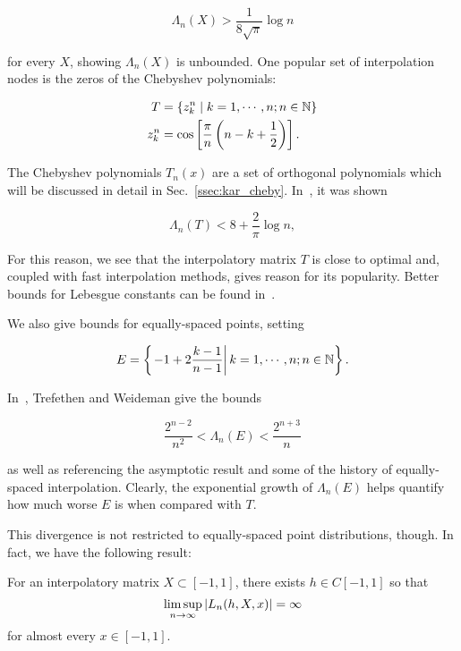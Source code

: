 \begin{equation}
    \Lambda_{n}(X) > \frac{1}{8\sqrt{\pi}}\log n
\end{equation}

\noindent
for every $X$, showing $\Lambda_{n}(X)$ is unbounded.
One popular set of interpolation nodes is the zeros
of the Chebyshev polynomials:

\begin{align}
    T &= \left\{ z_{k}^{n} \mid k=1,\cdots,n; n\in\mathbb{N} \right\} \nonumber\\
    z_{k}^{n} &= \cos\left[ \frac{\pi}{n}\left( n-k+\frac{1}{2} \right) \right].
\end{align}

\noindent
The Chebyshev polynomials $T_{n}(x)$ are a set of orthogonal polynomials
which will be discussed in detail in Sec.~\ref{ssec:kar_cheby}.
In~\cite{Brutman1978}, it was shown

\begin{equation}
    \Lambda_{n}(T) < 8 + \frac{2}{\pi}\log n,
\end{equation}

\noindent
For this reason, we see that the interpolatory matrix $T$
is close to optimal and,
coupled with fast interpolation methods, gives reason
for its popularity. Better bounds for Lebesgue
constants can be found in~\cite{smith2006lebesgue}.

We also give bounds for equally-spaced points, setting

\begin{equation}
    E = \left\{ \left. -1+2\frac{k-1}{n-1} \right| k=1,\cdots,n; n\in\mathbb{N} \right\}.
\end{equation}

\noindent
In~\cite{trefethen1991two}, Trefethen and Weideman give the bounds

\begin{equation}
    \frac{2^{n-2}}{n^{2}} < \Lambda_{n}(E) < \frac{2^{n+3}}{n}
\end{equation}

\noindent
as well as referencing the asymptotic result and some of the history
of equally-spaced interpolation.
Clearly, the exponential growth of
$\Lambda_{n}(E)$ helps quantify how much worse $E$ is when
compared with $T$.

This divergence is not restricted to equally-spaced point
distributions, though.
In fact, we have the following result:

\begin{thm}
For an interpolatory matrix $X\subset[-1,1]$, there exists $h\in C[-1,1]$
so that
%
\begin{equation}
    \limsup_{n\to\infty} \left| L_{n}(h,X,x) \right| = \infty
\end{equation}
%
for almost every $x\in[-1,1]$.
\end{thm}


